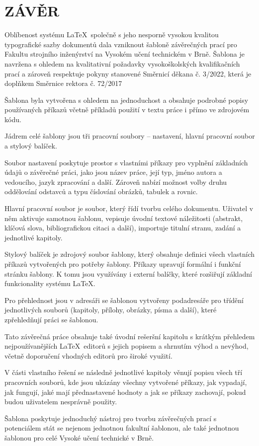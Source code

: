 
\chapter*{ZÁVĚR}
{}

Oblíbenost systému \LaTeX\ společně s jeho nesporně vysokou kvalitou typografické sazby dokumentů dala vzniknout šabloně závěrečných prací pro Fakultu strojního inženýrství na Vysokém učení technickém v Brně. Šablona je navržena s ohledem na kvalitativní požadavky vysokoškolských kvalifikačních prací a zároveň respektuje pokyny stanovené Směrnicí děkana č. 3/2022, která je doplňkem Směrnice rektora č. 72/2017 

Šablona byla vytvořena s ohledem na jednoduchost a obsahuje podrobné popisy používaných příkazů včetně příkladů použití v textu práce i přímo ve zdrojovém kódu.

Jádrem celé šablony jsou tři pracovní soubory -- nastavení, hlavní pracovní soubor a stylový balíček.

Soubor nastavení poskytuje prostor s vlastními příkazy pro vyplnění základních údajů o závěrečné práci, jako jsou název práce, její typ, jméno autora a vedoucího, jazyk zpracování a další. Zároveň nabízí možnost volby druhu oddělování odstavců a typu číslování obrázků, tabulek a rovnic.

Hlavní pracovní soubor je soubor, který řídí tvorbu celého dokumentu. Uživatel v něm aktivuje samotnou šablonu, vepisuje úvodní textové náležitosti (abstrakt, klíčová slova, bibliografickou citaci a další), importuje titulní stranu, zadání a jednotlivé kapitoly.

Stylový balíček je zdrojový soubor šablony, který obsahuje definici všech vlastních příkazů vytvořených pro potřeby šablony. Příkazy upravují formální i funkční stránku šablony. K tomu jsou využívány i externí balíčky, které rozšiřují základní funkcionality systému \LaTeX.

Pro přehlednost jsou v adresáři se šablonou vytvořeny podadresáře pro třídění jednotlivých souborů (kapitoly, přílohy, obrázky, písma a další), které zpřehledňují práci se šablonou.

Tato závěrečná práce obsahuje také úvodní rešeršní kapitolu s krátkým přehledem nejpoužívanějších \LaTeX\ editorů s jejich popisem a shrnutím výhod a nevýhod, včetně doporučení vhodných editorů pro široké využití.

V části vlastního řešení se následně jednotlivé kapitoly věnují popisu všech tří pracovních souborů, kde jsou ukázány všechny vytvořené příkazy, jak vypadají, jak fungují, jaké mají přednastavené hodnoty a jak se příkazy zachovají, pokud budou uživatelem nesprávně použity.

Šablona poskytuje jednoduchý nástroj pro tvorbu závěrečných prací s potenciálem stát se nejenom jednotnou fakultní šablonou, ale také jednotnou šablonou pro celé Vysoké učení technické v Brně.


